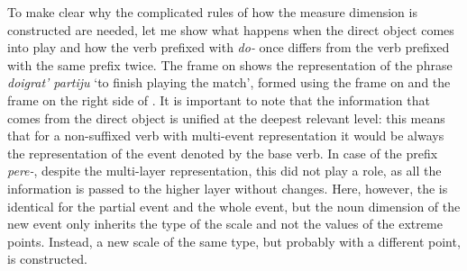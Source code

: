 To make clear why the complicated rules of how the measure dimension is constructed are needed, let me show what happens when the direct object comes into play and how the verb prefixed with \textit{do-} once differs from the verb prefixed with the same prefix twice. The frame on  shows the representation of the phrase \textit{doigrat' partiju} `to finish playing the match', formed using the frame on  and the frame on the right side of . It is important to note that the information that comes from the direct object is unified at the deepest relevant level: this means that for a non-suffixed verb with multi-event representation it would be always the representation of the event denoted by the base verb. In case of the prefix \textit{pere-}, despite the multi-layer representation, this did not play a role, as all the information is passed to the higher layer without changes. Here, however, the \THEME is identical for the partial event and the whole event, but the noun dimension of the new event only inherits the type of the scale and not the values of the extreme points. Instead, a new scale of the same type, but probably with a different \MIN point, is constructed.

